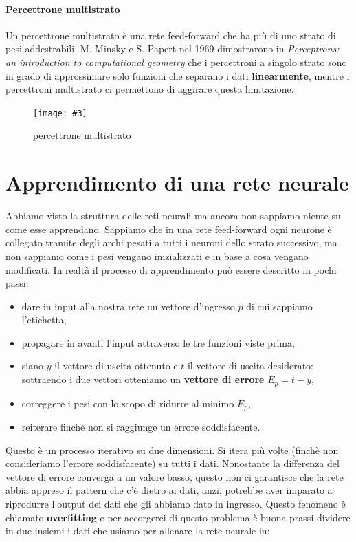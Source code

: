 \documentclass[12pt, twoside, letterpaper]{report}
\newcommand{\img}[4] {
	\begin{figure}
		\centering
		\texttt{[image: \#3]}\\
		\caption{#1}
		\label{#4}
	\end{figure}
}
\begin{document}
			\paragraph{Percettrone multistrato} Un percettrone multistrato è una rete feed-forward che ha più di uno strato di pesi addestrabili. M. Minsky e S. Papert nel 1969 dimostrarono in \textit{Perceptrons: an introduction to computational geometry} che i percettroni a singolo strato sono in grado di approssimare solo funzioni che separano i dati \textbf{linearmente}, mentre i percettroni multistrato ci permettono di aggirare questa limitazione. 
				\img{percettrone multistrato}{0.5}{nn-feed-forward.png}{feedforward}
		
		\section{Apprendimento di una rete neurale}
			Abbiamo visto la struttura delle reti neurali ma ancora non sappiamo niente su come esse apprendano. Sappiamo che in una rete feed-forward ogni neurone è collegato tramite degli archi pesati a tutti i neuroni dello strato successivo, ma non sappiamo come i pesi vengano inizializzati e in base a cosa vengano modificati. In realtà il processo di apprendimento può essere descritto in pochi passi: 
			\begin{itemize}
				\item dare in input alla nostra rete un vettore d'ingresso $p$ di cui sappiamo l'etichetta,
				\item propagare in avanti l'input attraverso le tre funzioni viste prima, %
				\item siano $y$ il vettore di uscita ottenuto e $t$ il vettore di uscita desiderato: sottraendo i due vettori otteniamo un \textbf{vettore di errore} $E_p = t - y$,
				\item correggere i pesi con lo scopo di ridurre al minimo $E_p$,
				\item reiterare finchè non si raggiunge un errore soddisfacente.
			\end{itemize}
			Questo è un processo iterativo su due dimensioni. Si itera più volte (finchè non consideriamo l'errore soddisfacente) su tutti i dati. Nonostante la differenza del vettore di errore converga a un valore basso, questo non ci garantisce che la rete abbia appreso il pattern che c'è dietro ai dati, anzi, potrebbe aver imparato a riprodurre l'output dei dati che gli abbiamo dato in ingresso. Questo fenomeno è chiamato \textbf{overfitting} e per accorgerci di questo problema è buona prassi dividere in due insiemi i dati che usiamo per allenare la rete neurale in: 
\end{document}
